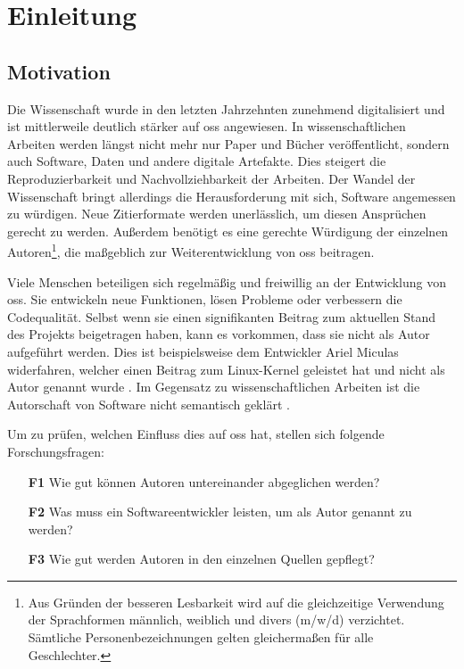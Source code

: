 \chapter{Einleitung}
\label{chap:einleitung}
\section{Motivation}
\label{sec:motivation}
Die Wissenschaft wurde in den letzten Jahrzehnten zunehmend digitalisiert und ist mittlerweile deutlich stärker auf \gls{oss} angewiesen.
In wissenschaftlichen Arbeiten werden längst nicht mehr nur Paper und Bücher veröffentlicht, sondern auch Software, Daten und andere digitale Artefakte.
Dies steigert die Reproduzierbarkeit und Nachvollziehbarkeit der Arbeiten.
Der Wandel der Wissenschaft bringt allerdings die Herausforderung mit sich, Software angemessen zu würdigen.
Neue Zitierformate werden unerlässlich, um diesen Ansprüchen gerecht zu werden.
Außerdem benötigt es eine gerechte Würdigung der einzelnen Autoren\footnote{Aus Gründen der besseren Lesbarkeit wird auf die gleichzeitige Verwendung der Sprachformen männlich, weiblich und divers (m/w/d) verzichtet. Sämtliche Personenbezeichnungen gelten gleichermaßen für alle Geschlechter.}, die maßgeblich zur Weiterentwicklung von \gls{oss} beitragen.

Viele Menschen beteiligen sich regelmäßig und freiwillig an der Entwicklung von \gls{oss}.
Sie entwickeln neue Funktionen, lösen Probleme oder verbessern die Codequalität.
Selbst wenn sie einen signifikanten Beitrag zum aktuellen Stand des Projekts beigetragen haben, kann es vorkommen, dass sie nicht als Autor aufgeführt werden.
Dies ist beispielsweise dem Entwickler Ariel Miculas widerfahren, welcher einen Beitrag zum Linux-Kernel geleistet hat und nicht als Autor genannt wurde \autocite{miculas_how_2023}.
Im Gegensatz zu wissenschaftlichen Arbeiten ist die Autorschaft von Software nicht semantisch geklärt \autocite{schmidt_software_nodate}.

Um zu prüfen, welchen Einfluss dies auf \gls{oss} hat, stellen sich folgende Forschungsfragen:

\begin{itemize}
    \item[\textbf{F1}] Wie gut können Autoren untereinander abgeglichen werden?
    \item[\textbf{F2}] Was muss ein Softwareentwickler leisten, um als Autor genannt zu werden?
    \item[\textbf{F3}] Wie gut werden Autoren in den einzelnen Quellen gepflegt?
\end{itemize}


